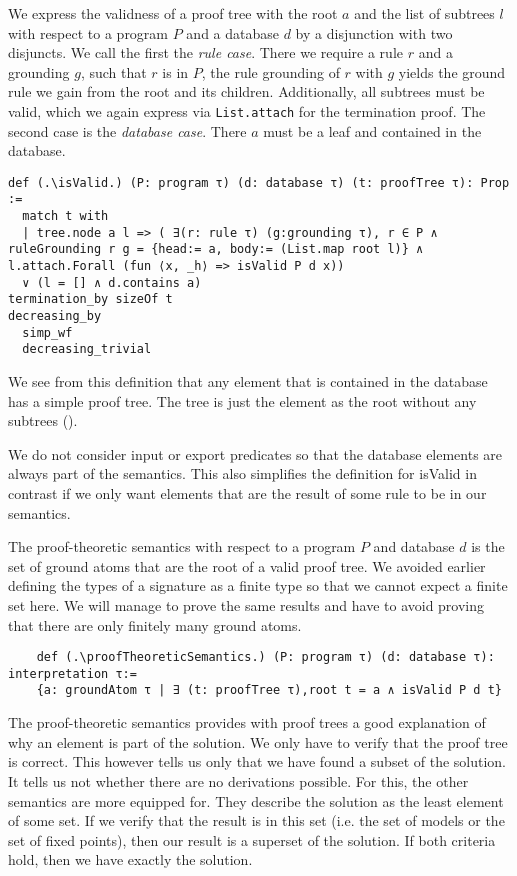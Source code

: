 We express the validness of a proof tree with the root $a$ and the list of subtrees $l$ with respect to a program $P$ and a database $d$ by a disjunction with two disjuncts. We call the first the \textit{rule case}. There we require a rule $r$ and a grounding $g$, such that $r$ is in $P$, the rule grounding of $r$ with $g$ yields the ground rule we gain from the root and its children. Additionally, all subtrees must be valid, which we again express via \lstinline|List.attach| for the termination proof. 
The second case is the \textit{database case}. There $a$ must be a leaf and contained in the database.

\begin{lstlisting}
def (.\isValid.) (P: program τ) (d: database τ) (t: proofTree τ): Prop :=
  match t with
  | tree.node a l => ( ∃(r: rule τ) (g:grounding τ), r ∈ P ∧ ruleGrounding r g = {head:= a, body:= (List.map root l)} ∧ l.attach.Forall (fun ⟨x, _h⟩ => isValid P d x)) 
  ∨ (l = [] ∧ d.contains a)
termination_by sizeOf t
decreasing_by
  simp_wf
  decreasing_trivial
\end{lstlisting}

We see from this definition that any element that is contained in the database has a simple proof tree. The tree is just the element as the root without any subtrees (\databaseElementsHaveValidProofTree). 

We do not consider input or export predicates so that the database elements are always part of the semantics. This also simplifies the definition for isValid in contrast if we only want elements that are the result of some rule to be in our semantics.

The proof-theoretic semantics with respect to a program $P$ and database $d$ is the set of ground atoms that are the root of a valid proof tree. We avoided earlier defining the types of a signature as a finite type so that we cannot expect a finite set here. We will manage to prove the same results and have to avoid proving that there are only finitely many ground atoms.

\begin{lstlisting}
    def (.\proofTheoreticSemantics.) (P: program τ) (d: database τ): interpretation τ:= 
    {a: groundAtom τ | ∃ (t: proofTree τ),root t = a ∧ isValid P d t}
\end{lstlisting}

The proof-theoretic semantics provides with proof trees a good explanation of why an element is part of the solution. We only have to verify that the proof tree is correct. This however tells us only that we have found a subset of the solution. It tells us not whether there are no derivations possible. For this, the other semantics are more equipped for. They describe the solution as the least element of some set. If we verify that the result is in this set (i.e. the set of models or the set of fixed points), then our result is a superset of the solution. If both criteria hold, then we have exactly the solution.

